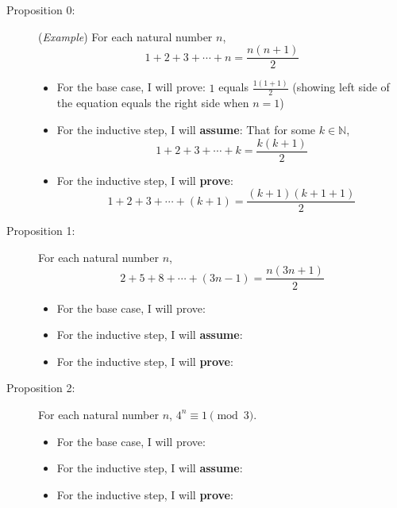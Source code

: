 \documentclass[11pt]{article}
\begin{document}
\begin{description}
		\item[Proposition 0:] (\emph{Example}) For each natural number $n$, 
		\[ 1 + 2 + 3 + \cdots + n = \frac{n(n+1)}{2} \]
		\begin{itemize}
			\item For the base case, I will prove: $1$ equals $\frac{1(1+1)}{2}$ (showing left side of the equation equals the right side when $n=1$)
 			
			\item For the inductive step, I will \textbf{assume}: That for some $k \in \mathbb{N}$, 
			\[ 1 + 2 + 3 + \cdots + k = \frac{k(k+1)}{2} \]
		
			\item For the inductive step, I will \textbf{prove}: 
			\[ 1 + 2 + 3 + \cdots + (k+1) = \frac{(k+1)(k+1+1)}{2} \]
			
					\end{itemize}
	
	
		\item[Proposition 1:] For each natural number $n$, 
		\[ 2 + 5 + 8 + \cdots + (3n-1) = \frac{n(3n+1)}{2} \]
		\begin{itemize}
			\item For the base case, I will prove: 
			\vspace{0.5in}
			
			\item For the inductive step, I will \textbf{assume}: 
			\vspace{0.5in}
			\item For the inductive step, I will \textbf{prove}: 
			\vspace{0.5in}
		\end{itemize}
		
		\item[Proposition 2:] For each natural number $n$, $4^n \equiv 1 \pmod 3$. 
		\begin{itemize}
			\item For the base case, I will prove: 
			\vspace{0.5in}
			
			\item For the inductive step, I will \textbf{assume}: 
			\vspace{0.5in}
			\item For the inductive step, I will \textbf{prove}: 
			\vspace{0.5in}
		\end{itemize}
		

\end{description}
\end{document}
